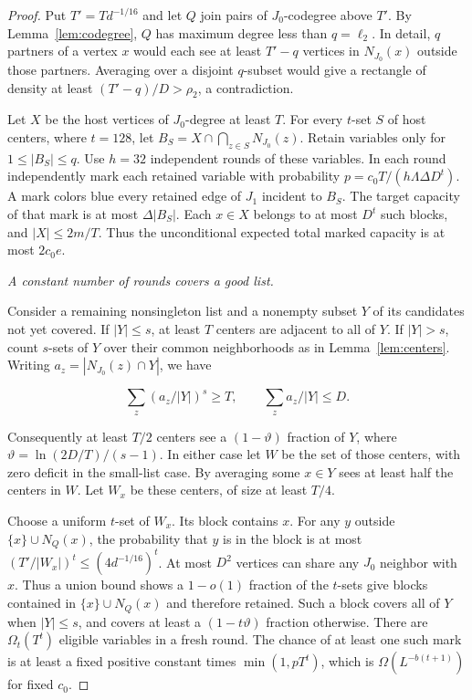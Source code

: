 \documentclass[11pt]{amsart}
\theoremstyle{definition}
\theoremstyle{remark}
\numberwithin{equation}{section}
\begin{document}
\begin{proof}
Put $T'=T d^{-1/16}$ and let $ Q $ join pairs of $ J_0$-codegree above $ T'$. By Lemma~\ref{lem:codegree}, $ Q $ has maximum degree less than $ q=\ell_2$. In detail, $ q $ partners of a vertex $ x $ would each see at least $ T'-q $ vertices in $ N_{J_0}(x)$ outside those partners. Averaging over a disjoint $ q $-subset would give a rectangle of density at least $(T'-q)/D>\rho_2$, a contradiction.

Let $X $ be the host vertices of $ J_0$-degree at least $ T $. For every $ t $-set $ S $ of host centers, where $ t=128$, let $ B_S=X\cap\bigcap_{z\in S}N_{J_0}(z)$. Retain variables only for $1\le |B_S|\le q $. Use $ h=32$ independent rounds of these variables. In each round independently mark each retained variable with probability $ p=c_0 T/(h\Lambda\Delta D^t)$. A mark colors blue every retained edge of $ J_1$ incident to $ B_S $. The target capacity of that mark is at most $\Delta|B_S|$. Each $ x\in X $ belongs to at most $ D^t $ such blocks, and $|X|\le2m/T $. Thus the unconditional expected total marked capacity is at most $2c_0 e$.

\medskip\noindent\emph{A constant number of rounds covers a good list.}

Consider a remaining nonsingleton list and a nonempty subset $Y $ of its candidates not yet covered. If $|Y|\le s $, at least $ T $ centers are adjacent to all of $ Y $. If $|Y|>s $, count $ s $-sets of $ Y $ over their common neighborhoods as in Lemma~\ref{lem:centers}. Writing $ a_z=|N_{J_0}(z)\cap Y|$, we have

\begin{equation}
\sum_z (a_z/|Y|)^s\ge T,\qquad \sum_z a_z/|Y|\le D.
\end{equation}

Consequently at least $T/2$ centers see a $(1-\vartheta)$ fraction of $ Y $, where $\vartheta=\ln(2D/T)/(s-1)$. In either case let $ W $ be the set of those centers, with zero deficit in the small-list case. By averaging some $ x\in Y $ sees at least half the centers in $ W $. Let $ W_x $ be these centers, of size at least $ T/4$.

Choose a uniform $t $-set of $ W_x $. Its block contains $ x $. For any $ y $ outside $\{x\}\cup N_Q(x)$, the probability that $ y $ is in the block is at most $(T'/|W_x|)^t\le(4d^{-1/16})^t $. At most $ D^2$ vertices can share any $ J_0$ neighbor with $ x $. Thus a union bound shows a $1-o(1)$ fraction of the $ t $-sets give blocks contained in $\{x\}\cup N_Q(x)$ and therefore retained. Such a block covers all of $ Y $ when $|Y|\le s $, and covers at least a $(1-t\vartheta)$ fraction otherwise. There are $\Omega_t(T^t)$ eligible variables in a fresh round. The chance of at least one such mark is at least a fixed positive constant times $\min(1,pT^t)$, which is $\Omega(L^{-b(t+1)})$ for fixed $ c_0$.


\end{proof}
\end{document}
